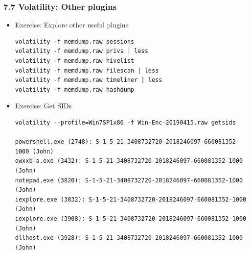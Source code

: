\begin{frame}[fragile]
  \frametitle{7.7 Volatility: Other plugins}
    \begin{itemize}
        \item Exercise: Explore other useful plugins
    \begin{lstlisting}[basicstyle=\tiny]
volatility -f memdump.raw sessions
volatility -f memdump.raw privs | less
volatility -f memdump.raw hivelist
volatility -f memdump.raw filescan | less
volatility -f memdump.raw timeliner | less
volatility -f memdump.raw hashdump
    \end{lstlisting}
        \item Exercise: Get SIDs
    \begin{lstlisting}[basicstyle=\tiny]
volatility --profile=Win7SP1x86 -f Win-Enc-20190415.raw getsids

powershell.exe (2748): S-1-5-21-3408732720-2018246097-660081352-1000 (John)
owxxb-a.exe (3432): S-1-5-21-3408732720-2018246097-660081352-1000 (John)
notepad.exe (3820): S-1-5-21-3408732720-2018246097-660081352-1000 (John)
iexplore.exe (3832): S-1-5-21-3408732720-2018246097-660081352-1000 (John)
iexplore.exe (3908): S-1-5-21-3408732720-2018246097-660081352-1000 (John)
dllhost.exe (3928): S-1-5-21-3408732720-2018246097-660081352-1000 (John)
    \end{lstlisting}
    \end{itemize}
\end{frame}


